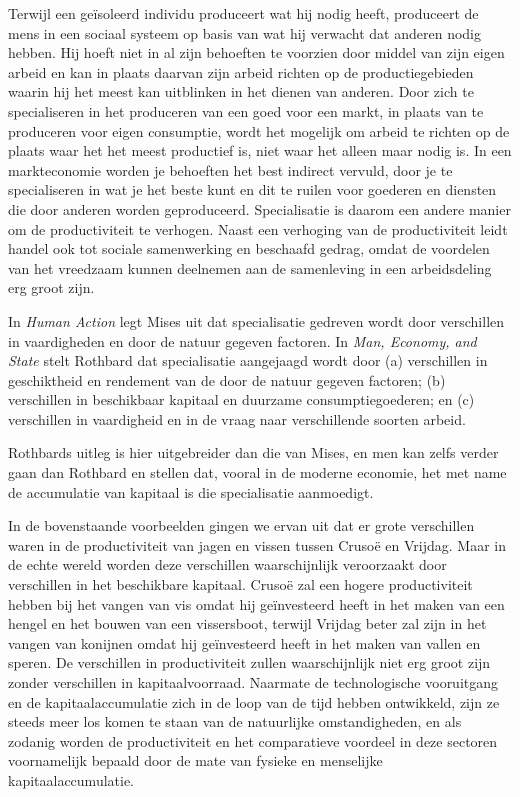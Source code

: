 Terwijl een geïsoleerd individu produceert wat hij nodig heeft, produceert de mens in een sociaal systeem op basis van wat hij verwacht dat anderen nodig hebben. Hij hoeft niet in al zijn behoeften te voorzien door middel van zijn eigen arbeid en kan in plaats daarvan zijn arbeid richten op de productiegebieden waarin hij het meest kan uitblinken in het dienen van anderen. Door zich te specialiseren in het produceren van een goed voor een markt, in plaats van te produceren voor eigen consumptie, wordt het mogelijk om arbeid te richten op de plaats waar het het meest productief is, niet waar het alleen maar nodig is. In een markteconomie worden je behoeften het best indirect vervuld, door je te specialiseren in wat je het beste kunt en dit te ruilen voor goederen en diensten die door anderen worden geproduceerd. Specialisatie is daarom een andere manier om de productiviteit te verhogen. Naast een verhoging van de productiviteit leidt handel ook tot sociale samenwerking en beschaafd gedrag, omdat de voordelen van het vreedzaam kunnen deelnemen aan de samenleving in een arbeidsdeling erg groot zijn.

In \textit{Human Action} legt Mises uit dat specialisatie gedreven wordt door verschillen in vaardigheden en door de natuur gegeven factoren. In \textit{Man, Economy, and State} stelt Rothbard dat specialisatie aangejaagd wordt door (a) verschillen in geschiktheid en rendement van de door de natuur gegeven factoren; (b) verschillen in beschikbaar kapitaal en duurzame consumptiegoederen; en (c) verschillen in vaardigheid en in de vraag naar verschillende soorten arbeid.

Rothbards uitleg is hier uitgebreider dan die van Mises, en men kan zelfs verder gaan dan Rothbard en stellen dat, vooral in de moderne economie, het met name de accumulatie van kapitaal is die specialisatie aanmoedigt.

In de bovenstaande voorbeelden gingen we ervan uit dat er grote verschillen waren in de productiviteit van jagen en vissen tussen Crusoë en Vrijdag. Maar in de echte wereld worden deze verschillen waarschijnlijk veroorzaakt door verschillen in het beschikbare kapitaal. Crusoë zal een hogere productiviteit hebben bij het vangen van vis omdat hij geïnvesteerd heeft in het maken van een hengel en het bouwen van een vissersboot, terwijl Vrijdag beter zal zijn in het vangen van konijnen omdat hij geïnvesteerd heeft in het maken van vallen en speren. De verschillen in productiviteit zullen waarschijnlijk niet erg groot zijn zonder verschillen in kapitaalvoorraad. Naarmate de technologische vooruitgang en de kapitaalaccumulatie zich in de loop van de tijd hebben ontwikkeld, zijn ze steeds meer los komen te staan van de natuurlijke omstandigheden, en als zodanig worden de productiviteit en het comparatieve voordeel in deze sectoren voornamelijk bepaald door de mate van fysieke en menselijke kapitaalaccumulatie.

